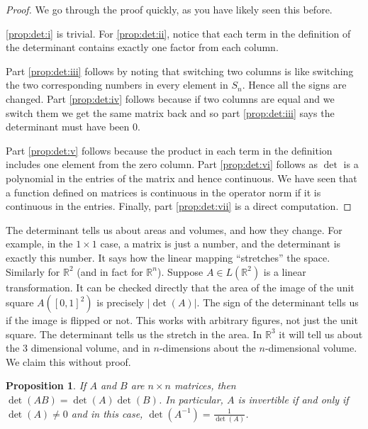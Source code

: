 \documentclass[12pt]{book}
\newcommand{\abs}[1]{\left\lvert {#1} \right\rvert}
\newcommand{\R}{{\mathbb{R}}}
\theoremstyle{plain}
\newtheorem{prop}[thm]{Proposition}
\theoremstyle{remark}
\theoremstyle{definition}
\theoremstyle{exercise}
\theoremstyle{example}
\begin{document}
\begin{proof}
We go through the proof quickly, as you have likely seen this before.

\ref{prop:det:i} is trivial.  For \ref{prop:det:ii}, notice that each term in the definition of the
determinant contains exactly one factor from each column.

Part \ref{prop:det:iii} follows by noting that switching two columns is like switching the
two corresponding numbers in every element in $S_n$.  Hence all the signs
are changed.
Part \ref{prop:det:iv} follows because if two columns are equal and we switch them we get
the same matrix back and so part \ref{prop:det:iii} says the determinant must have been
0.

Part \ref{prop:det:v} follows because the product in each term in the definition includes
one element from the zero column.
Part \ref{prop:det:vi} follows as $\det$ is a polynomial in the entries of the matrix
and hence continuous.  We have seen that a function defined on
matrices is continuous in the operator norm if it is 
continuous in the entries.
Finally, part \ref{prop:det:vii} is a direct computation.
\end{proof}

The determinant tells us about areas and volumes, and how they change.
For example, in the $1 \times 1$ case, a matrix is just a number, and the
determinant is exactly this number.  It says how the linear mapping
``stretches'' the space.  Similarly for $\R^2$ (and in fact for $\R^n$).
Suppose $A \in L(\R^2)$ is a linear transformation.  It can be checked directly that
the area of the image of the unit square $A([0,1]^2)$ is precisely
$\abs{\det(A)}$.  The sign of the determinant tells us if the image is
flipped or not.  This works with arbitrary figures, not just the unit
square.  The determinant tells us the stretch in the area.  In $\R^3$ it
will tell us about the 3 dimensional volume, and in $n$-dimensions about the
$n$-dimensional volume.  We claim this without proof.

\begin{prop}
If $A$ and $B$ are $n\times n$ matrices, then $\det(AB) = \det(A)\det(B)$.
In particular, $A$ is invertible if and only if $\det(A) \not= 0$ and in
this case, $\det(A^{-1}) = \frac{1}{\det(A)}$.
\end{prop}
\end{document}
